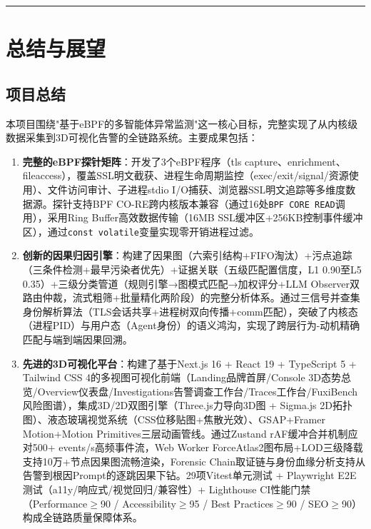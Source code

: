 \documentclass[a4paper]{ctexart}
\makeatletter
\renewcommand{\_}{%
  \ifmmode
    \nfss@text{\textunderscore}%
  \else
    \textunderscore\discretionary{}{}{}%
  \fi}
\makeatother
\begin{document}
\bigskip
\hrule
\bigskip


\section{总结与展望}



\subsection{项目总结}



本项目围绕"基于eBPF的多智能体异常监测"这一核心目标，完整实现了从内核级数据采集到3D可视化告警的全链路系统。主要成果包括：


\begin{enumerate}
\item \textbf{完整的eBPF探针矩阵}：开发了3个eBPF程序（tls\_capture、enrichment、fileaccess），覆盖SSL明文截获、进程生命周期监控（exec/exit/signal/资源使用）、文件访问审计、子进程stdio I/O捕获、浏览器SSL明文追踪等多维度数据源。探针支持BPF CO-RE跨内核版本兼容（通过16处\texttt{BPF\_CORE\_READ}调用），采用Ring Buffer高效数据传输（16MB SSL缓冲区+256KB控制事件缓冲区），通过\texttt{const volatile}变量实现零开销进程过滤。

\item \textbf{创新的因果归因引擎}：构建了因果图（六索引结构+FIFO淘汰）+污点追踪（三条件检测+最早污染者优先）+证据关联（五级匹配置信度，L1 0.90至L5 0.35）+三级分类管道（规则引擎→图模式匹配→加权评分+LLM Observer双路由仲裁，流式粗筛+批量精化两阶段）的完整分析体系。通过三信号并查集身份解析算法（TLS会话共享+进程树双向传播+comm匹配），突破了内核态（进程PID）与用户态（Agent身份）的语义鸿沟，实现了跨层行为-动机精确匹配与端到端因果回溯。

\item \textbf{先进的3D可视化平台}：构建了基于Next.js 16 + React 19 + TypeScript 5 + Tailwind CSS 4的多视图可视化前端（Landing品牌首屏/Console 3D态势总览/Overview仪表盘/Investigations告警调查工作台/Traces工作台/FuxiBench风险图谱），集成3D/2D双图引擎（Three.js力导向3D图 + Sigma.js 2D拓扑图）、液态玻璃视觉系统（CSS位移贴图+焦散光效）、GSAP+Framer Motion+Motion Primitives三层动画管线。通过Zustand rAF缓冲合并机制应对500+ events/s高频事件流，Web Worker ForceAtlas2图布局+LOD三级降载支持10万+节点因果图流畅渲染，Forensic Chain取证链与身份血缘分析支持从告警到根因Prompt的逐跳因果下钻。29项Vitest单元测试 + Playwright E2E测试（a11y/响应式/视觉回归/兼容性）+ Lighthouse CI性能门禁（Performance$\geq$90 / Accessibility$\geq$95 / Best Practices$\geq$90 / SEO$\geq$90）构成全链路质量保障体系。


\end{enumerate}
\end{document}
